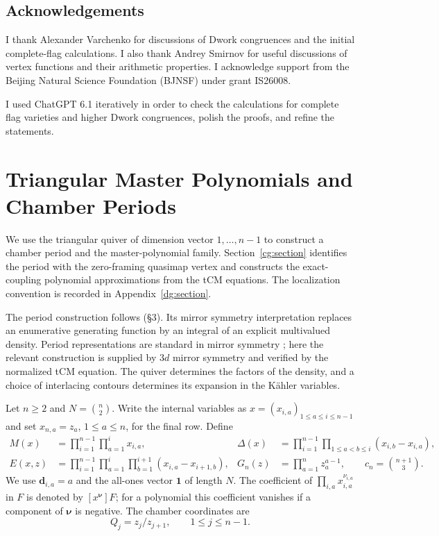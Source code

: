 \documentclass[11pt]{amsart}
\theoremstyle{definition}
\theoremstyle{remark}
\numberwithin{equation}{section}
\begin{document}
\subsection{Acknowledgements}
I thank Alexander Varchenko for discussions of Dwork
congruences and the initial complete-flag calculations. I also
thank Andrey Smirnov for useful discussions of vertex functions and
their arithmetic properties. I acknowledge support from the Beijing Natural Science Foundation
(BJNSF) under grant IS26008.

I used ChatGPT 6.1 iteratively in order to check the calculations for complete flag varieties and higher Dwork congruences, polish the proofs, and refine the statements. 


\section{Triangular Master Polynomials and Chamber Periods}
\label{ar:section-master}
We use the triangular quiver of dimension vector $1,\ldots,n-1$
to construct a chamber period and the master-polynomial family.
Section~\ref{cg:section} identifies the period with the zero-framing
quasimap vertex and constructs the exact-coupling polynomial
approximations from the tCM equations.
The localization convention is recorded in Appendix~\ref{dg:section}.

The period construction follows \cite{SV23} (\S3). Its mirror
symmetry interpretation replaces an enumerative generating
function by an integral of an explicit multivalued density.
Period representations are standard in mirror symmetry
\cite{Hori03}; here the relevant construction is supplied by
$3d$ mirror symmetry and verified by the normalized tCM equation.
The quiver determines the factors of the density, and a choice
of interlacing contours determines its expansion in the
K\"ahler variables.

Let $n\geq2$ and $N=\binom n2$. Write the internal variables as
$x=(x_{i,a})_{1\leq a\leq i\leq n-1}$ and set
$x_{n,a}=z_a$, $1\leq a\leq n$, for the final row. Define
\begin{align}
 M(x)&=\prod_{i=1}^{n-1}\prod_{a=1}^i x_{i,a},
 &\Delta(x)&=\prod_{i=1}^{n-1}\prod_{1\leq a<b\leq i}
                   (x_{i,b}-x_{i,a}),\label{ar:M-Delta}\\
 E(x,z)&=\prod_{i=1}^{n-1}\prod_{a=1}^i\prod_{b=1}^{i+1}
                   (x_{i,a}-x_{i+1,b}),
 &G_n(z)&=\prod_{a=1}^n z_a^{a-1},
 \qquad c_n=\binom{n+1}{3}.\label{ar:E-G}
\end{align}
We use $\mathbf d_{i,a}=a$ and the all-ones vector $\mathbf1$ of
length $N$. The coefficient of
$\prod_{i,a}x_{i,a}^{\nu_{i,a}}$ in $F$ is denoted by
$[x^{\boldsymbol\nu}]F$; for a polynomial this coefficient
vanishes if a component of $\boldsymbol\nu$ is negative. The
chamber coordinates are
\begin{equation}\label{ar:Q}
 Q_j=z_j/z_{j+1},\qquad 1\leq j\leq n-1.
\end{equation}
\end{document}
